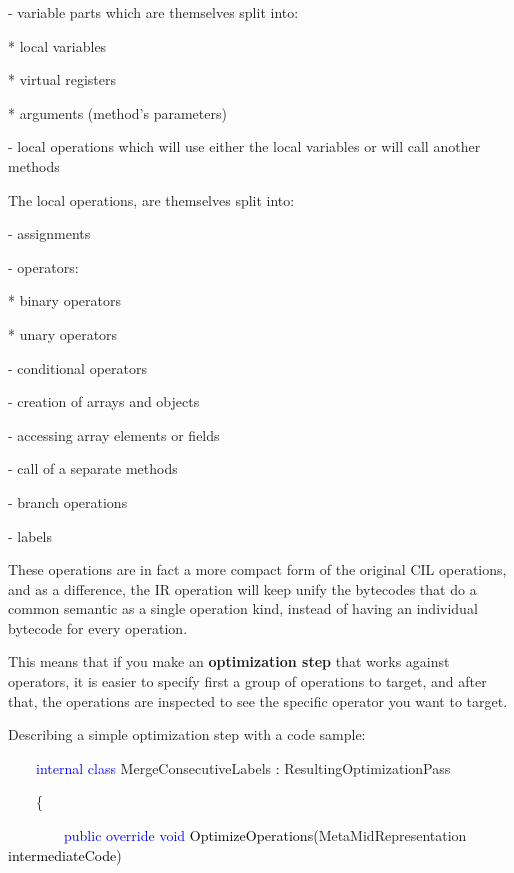 \documentclass[letterpaper]{article}
\begin{document}
{}- variable parts which are themselves split into:

* local variables

* virtual registers

* arguments (method's parameters)

{}- local operations which will use either the local variables or will call another methods

The local operations, are themselves split into:

{}- assignments

{}- operators:

* binary operators

* unary operators

{}- conditional operators

{}- creation of arrays and objects

{}- accessing array elements or fields

{}- call of a separate methods

{}- branch operations

{}- labels


\bigskip

These operations are in fact a more compact form of the original CIL operations, and as a difference, the IR operation
will keep unify the bytecodes that do a common semantic as a single operation kind, instead of having an individual
bytecode for every operation.

This means that if you make an \textbf{optimization step} that works against operators, it is easier to specify first a
group of operations to target, and after that, the operations are inspected to see the specific operator you want to
target.

Describing a simple optimization step with a code sample:


\bigskip

\ \ \ \ \textcolor{blue}{internal}\textcolor{black}{ }\textcolor{blue}{class}\textcolor{black}{
}\textcolor[rgb]{0.16862746,0.5686275,0.6862745}{MergeConsecutiveLabels}\textcolor{black}{ :
}\textcolor[rgb]{0.16862746,0.5686275,0.6862745}{ResultingOptimizationPass}

{\color{black}
\ \ \ \ \{}

\textcolor{black}{\ \ \ \ \ \ \ \ }\textcolor{blue}{public}\textcolor{black}{
}\textcolor{blue}{override}\textcolor{black}{ }\textcolor{blue}{void}\textcolor{black}{
OptimizeOperations(}\textcolor[rgb]{0.16862746,0.5686275,0.6862745}{MetaMidRepresentation}\textcolor{black}{
intermediateCode)}
\end{document}
